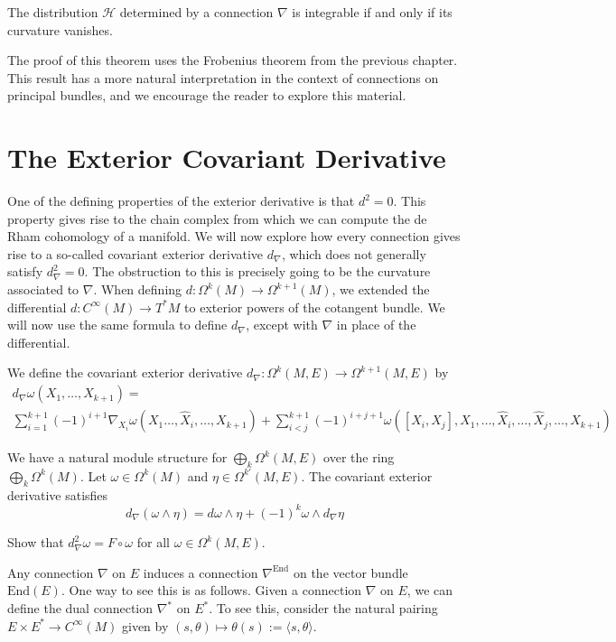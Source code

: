 \begin{theorem}
  The distribution $\mathcal{H}$ determined by a connection $\nabla$ is integrable if and only if its curvature vanishes.
\end{theorem}
The proof of this theorem uses the Frobenius theorem from the previous chapter. This result has a more natural interpretation in the context of connections on principal bundles, and we encourage the reader to explore this material.

\section{The Exterior Covariant Derivative}

One of the defining properties of the exterior derivative is that $d^2=0$. This property gives rise to the chain complex from which we can compute the de Rham cohomology of a manifold. We will now explore how every connection gives rise to a so-called covariant exterior derivative $d_\nabla$, which does not generally satisfy $d_\nabla^2=0$. The obstruction to this is precisely going to be the curvature associated to $\nabla$. When defining $d:\Omega^k(M)\to\Omega^{k+1}(M)$, we extended the differential $d:C^\infty(M)\to T^*M$ to exterior powers of the cotangent bundle. We will now use the same formula to define $d_\nabla$, except with $\nabla$ in place of the differential.
\begin{definition}
  We define the covariant exterior derivative $d_\nabla:\Omega^k(M,E)\to\Omega^{k+1}(M,E)$ by 
  \begin{align*}
    d_\nabla\omega(X_1,\dots,X_{k+1})=\\\sum^{k+1}_{i=1}(-1)^{i+1}\nabla_{X_i}\omega(X_1\dots,\widehat{X}_i,\dots,X_{k+1})+\sum_{i<j}^{k+1}(-1)^{i+j+1}\omega([X_i,X_j],X_1,\dots,\widehat{X}_i,\dots,\widehat{X}_j,\dots,X_{k+1})
  \end{align*}
\end{definition}
We have a natural module structure for $\bigoplus_k\Omega^k(M,E)$ over the ring $\bigoplus_k\Omega^k(M)$. Let $\omega\in\Omega^k(M)$ and $\eta\in\Omega^{k'}(M,E)$. The covariant exterior derivative satisfies
$$d_\nabla(\omega\wedge\eta)=d\omega\wedge\eta+(-1)^k\omega\wedge d_\nabla\eta$$
\begin{exercise}
  Show that $d_\nabla^2\omega=F\circ\omega$ for all $\omega\in\Omega^k(M,E)$.
\end{exercise}
Any connection $\nabla$ on $E$ induces a connection $\nabla^\text{End}$ on the vector bundle $\text{End}(E)$. One way to see this is as follows. Given a connection $\nabla$ on $E$, we can define the dual connection $\nabla^*$ on $E^*$. To see this, consider the natural pairing $E\times E^*\to C^\infty(M)$ given by $(s,\theta)\mapsto\theta(s):=\langle s,\theta\rangle$. 

